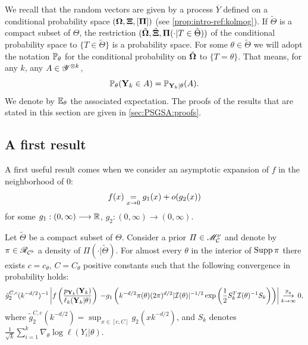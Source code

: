 We recall that the random vectors are given by a process $\overline{Y}$ defined on a conditional probability space $(\mathbf{\Omega},\mathbf{\Xi},[\mathbf{\Pi}] )$ (see \cref{prop:intro-ref:kolmog}). If $\tilde\Theta$ is a compact subset of $\Theta$, the restriction $(\tilde{\mathbf{\Omega}},\tilde{\mathbf{\Xi}}, \mathbf{\Pi}(\cdot|T\in\tilde\Theta))$ of the conditional probability space to $\{T\in\tilde\Theta\}$ is a probability space.
For some $\theta\in\tilde\Theta$ we will adopt the notation $\mathbb{P}_\theta$ for the conditional probability on $\tilde{\mathbf{\Omega}}$ to $\{T=\theta\}$. That means, for any $k$, any $A\in\mathscr{Y}^{\otimes k}$, 
    \begin{equation}
        \mathbb{P}_\theta(\mathbf{Y}_k\in A) = \mathbb{P}_{\mathbf{Y}_k|\theta}(A).
    \end{equation}
We denote by $\mathbb{E}_\theta$ the associated expectation.
The proofs of the results that are stated in this section are given in \cref{sec:PSGSA:proofs}.


\subsection{A first result}

A first useful result comes when we consider an asymptotic expansion of $f$ in the neighborhood of $0$:
\begin{equation}
    f(x) \overset{}{\underset{x\rightarrow0}{=}} g_1(x) + o(g_2(x))
\end{equation}
for some $g_1:(0,\infty)\longrightarrow\mathbb{R}$, $g_2:(0,\infty)\to(0,\infty)$.


\begin{prop}\label{prop:PSGSA:cvptheta}
    Let $\tilde\Theta$ be a compact subset of $\Theta$.
    Consider a prior $\varPi\in\mathscr{M}^\nu_{\mathcal{C}}$ and denote by $\pi\in\mathscr{R}_{\mathcal{C}^b}$ a density of $\varPi(\cdot|\tilde\Theta)$. %
    For almost every $\theta$ in the interior of $\operatorname{Supp}\pi$ there exists $c=c_\theta,\,C=C_\theta$ positive constants such that the following convergence in probability holds:
    \begin{equation}
        \label{eq:cvinproba}
        \tilde g_2^{C,c}(k^{-d/2})^{-1}\left| f\left(\frac{p_{\mbf Y_k}(\mbf Y_k)}{\ell_k(\mbf Y_k|\theta)}\right) \right.            \left. - g_1\left(k^{-d/2}\pi(\theta)(2\pi)^{d/2}|\cI(\theta)|^{-1/2}\exp\left(\frac{1}{2}S_k^T\cI(\theta)^{-1}S_k \right)\right) \right| %
                \conv[\PP_{\theta}]{k\rightarrow\infty} 0,
    \end{equation}
    where $\tilde g_2^{C,c}(k^{-d/2})=\sup_{x\in[c,C]} g_2(xk^{-d/2})$, and $S_k$ denotes $\frac{1}{\sqrt{k}}\sum_{i=1}^k\nabla_\theta\log\ell(Y_i|\theta)$.
\end{prop}


